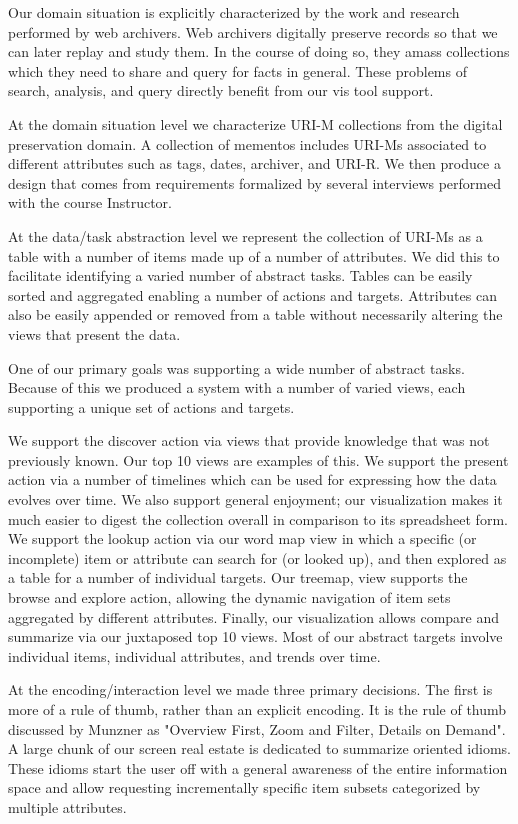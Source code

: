 \documentclass[10pt,journal,compsoc]{IEEEtran}
\begin{document}
Our domain situation is explicitly characterized by the work and research performed by web archivers. 
Web archivers digitally preserve records so that we can later replay and study them. 
In the course of doing so, they amass collections which they need to share and 
query for facts in general. These problems of search, analysis, and query directly 
benefit from our vis tool support. 

At the domain situation level we characterize URI-M collections from the digital preservation domain.
A collection of mementos includes URI-Ms associated to different attributes such as tags, dates, archiver, 
and URI-R. We then produce a design that comes from requirements formalized by several interviews performed 
with the course Instructor.

At the data/task abstraction level we represent the collection of URI-Ms as a table
with a number of items made up of a number of attributes. We did this to facilitate 
identifying a varied number of abstract tasks. Tables can be easily sorted and aggregated
enabling a number of actions and targets. Attributes can also be easily appended or removed
from a table without necessarily altering the views that present the data.

One of our primary goals was supporting a wide number of abstract tasks. Because of this
we produced a system with a number of varied views, each supporting a unique set of
actions and targets.

We support the discover action via views that provide knowledge that was not previously known.
Our top 10 views are examples of this. We support the present action via a number of timelines 
which can be used for expressing how the data evolves over time. 
We also support general enjoyment; our visualization makes it much easier to digest the
collection overall in comparison to its spreadsheet form. We support the 
lookup action via our word map view in which a specific (or incomplete) item or 
attribute can search for (or looked up), and then explored as a table for a number of individual
targets. Our treemap, view supports the browse and explore action, allowing the dynamic 
navigation of item sets aggregated by different attributes. Finally, our visualization allows 
compare and summarize via our juxtaposed top 10 views. Most of our abstract targets
involve individual items, individual attributes, and trends over time.

At the encoding/interaction level we made three primary decisions. The first is 
more of a rule of thumb, rather than an explicit encoding. It is the rule of thumb 
discussed by Munzner as "Overview First, Zoom and Filter, Details on Demand". 
A large chunk of our screen real estate is dedicated to summarize oriented idioms. 
These idioms start the user off with a general awareness of the entire information space
and allow requesting incrementally specific item subsets categorized by multiple attributes.
\end{document}

